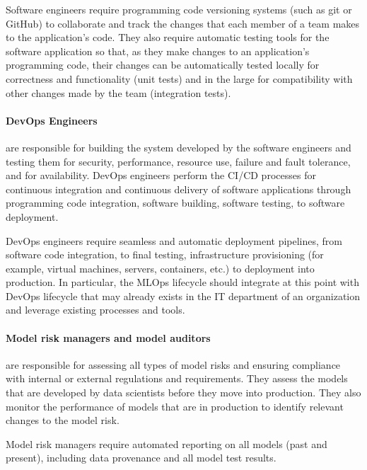 Software engineers require programming code versioning systems (such as git or GitHub) to collaborate and track the changes that each member of a team makes to the application's code. They also require automatic testing tools for the software application so that, as they make changes to an application's programming code, their changes can be automatically tested locally for correctness and functionality (unit tests) and in the large for compatibility with other changes made by the team (integration tests). 

\paragraph*{DevOps Engineers} are responsible for building the system developed by the software engineers and testing them for security, performance, resource use, failure and fault tolerance, and for availability. DevOps engineers perform the CI/CD processes for continuous integration and continuous delivery of software applications through programming code integration, software building, software testing, to software deployment. 

DevOps engineers require seamless and automatic deployment pipelines, from software code integration, to final testing, infrastructure provisioning (for example, virtual machines, servers, containers, etc.) to deployment into production. In particular, the MLOps lifecycle should integrate at this point with DevOps lifecycle that may already exists in the IT department of an organization and leverage existing processes and tools. 

\paragraph*{Model risk managers and model auditors} are responsible for assessing all types of model risks and ensuring compliance with internal or external regulations and requirements. They assess the models that are developed by data scientists before they move into production. They also monitor the performance of models that are in production to identify relevant changes to the model risk. 

Model risk managers require automated reporting on all models (past and present), including data provenance and all model test results.

